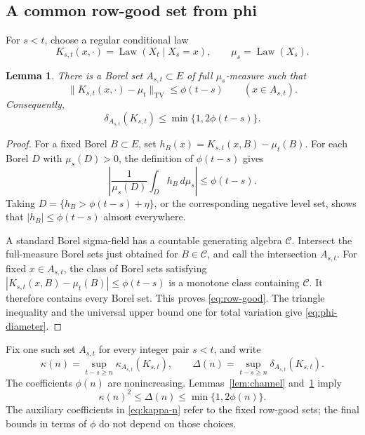 \documentclass[11pt]{amsart}
\numberwithin{equation}{section}
\newtheorem{lemma}[theorem]{Lemma}
\theoremstyle{definition}
\newcommand{\TV}{\mathrm{TV}}
\newcommand{\Law}{\operatorname{Law}}
\begin{document}
\subsection{A common row-good set from phi}
For $s<t$, choose a regular conditional law
\[
K_{s,t}(x,\cdot)=\Law(X_t\mid X_s=x),\qquad \mu_s=\Law(X_s).
\]

\begin{lemma}\label{lem:row-good}
There is a Borel set $A_{s,t}\subset E$ of full $\mu_s$-measure such that
\begin{equation}\label{eq:row-good}
\|K_{s,t}(x,\cdot)-\mu_t\|_{\TV}\le\phi(t-s)
\qquad(x\in A_{s,t}).
\end{equation}
Consequently,
\begin{equation}\label{eq:phi-diameter}
\delta_{A_{s,t}}(K_{s,t})\le\min\{1,2\phi(t-s)\}.
\end{equation}
\end{lemma}

\begin{proof}
For a fixed Borel $B\subset E$, set $h_B(x)=K_{s,t}(x,B)-\mu_t(B)$. For each Borel $D$ with $\mu_s(D)>0$, the definition of $\phi(t-s)$ gives
\[
\left|\frac1{\mu_s(D)}\int_D h_B\,d\mu_s\right|\le\phi(t-s).
\]
Taking $D=\{h_B>\phi(t-s)+\eta\}$, or the corresponding negative level set, shows that $|h_B|\le\phi(t-s)$ almost everywhere.

A standard Borel sigma-field has a countable generating algebra $\mathcal C$. Intersect the full-measure Borel sets just obtained for $B\in\mathcal C$, and call the intersection $A_{s,t}$. For fixed $x\in A_{s,t}$, the class of Borel sets satisfying $|K_{s,t}(x,B)-\mu_t(B)|\le\phi(t-s)$ is a monotone class containing $\mathcal C$. It therefore contains every Borel set. This proves \eqref{eq:row-good}. The triangle inequality and the universal upper bound one for total variation give \eqref{eq:phi-diameter}.
\end{proof}

Fix one such set $A_{s,t}$ for every integer pair $s<t$, and write
\begin{equation}\label{eq:kappa-n}
\kappa(n)=\sup_{t-s\ge n}\kappa_{A_{s,t}}(K_{s,t}),
\qquad
\Delta(n)=\sup_{t-s\ge n}\delta_{A_{s,t}}(K_{s,t}).
\end{equation}
The coefficients $\phi(n)$ are nonincreasing. Lemmas~\ref{lem:channel} and~\ref{lem:row-good} imply
\begin{equation}\label{eq:kappa-phi}
\kappa(n)^2\le\Delta(n)\le\min\{1,2\phi(n)\}.
\end{equation}
The auxiliary coefficients in \eqref{eq:kappa-n} refer to the fixed row-good sets; the final bounds in terms of $\phi$ do not depend on those choices.
\end{document}
